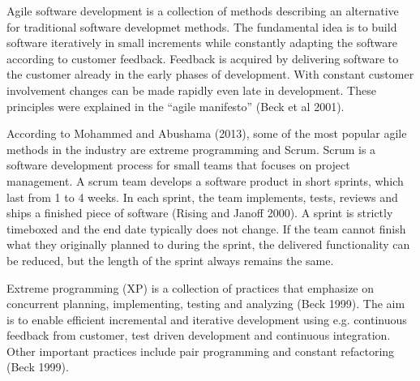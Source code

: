 Agile software development is a collection of methods describing an
alternative for traditional software developmet methods. The fundamental
idea is to build software iteratively in small increments while
constantly adapting the software according to customer feedback.
Feedback is acquired by delivering software to the customer already in
the early phases of development. With constant customer involvement
changes can be made rapidly even late in development. These principles were
explained in the ``agile manifesto'' (Beck et al 2001).

According to Mohammed and Abushama (2013), some of the most popular
agile methods in the industry are extreme programming and Scrum.
Scrum is a software development process for small teams that focuses
on project management. A scrum team develops a software product in
short sprints, which last from 1 to 4 weeks. In each sprint, the team
implements, tests, reviews and ships a finished piece of software
(Rising and Janoff 2000). A sprint is strictly timeboxed and the end
date typically does not change. If the team cannot finish what they
originally planned to during the sprint, the delivered functionality can
be reduced, but the length of the sprint always remains the same.

Extreme programming (XP) is a collection of practices that emphasize
on concurrent planning, implementing, testing and analyzing (Beck 1999). The
aim is to enable efficient incremental and iterative development
using e.g. continuous feedback from customer, test driven development
and continuous integration. Other important practices include pair
programming and constant refactoring (Beck 1999).
